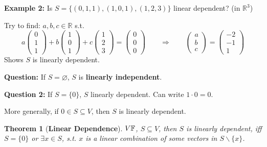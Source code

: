 \documentclass[12pt]{article}
\theoremstyle{plain}
\newtheorem{theorem}{Theorem}[subsection]
\newcommand{\mR}{{\mathbb{R}}}
\newcommand{\mF}{{\mathbb{F}}}
\let\emptyset\varnothing
\begin{document}
	{\color{Brown}
	\textbf{Example 2:} 
	Is $S = \{(0, 1, 1), (1, 0, 1), (1, 2, 3)\}$ linear dependent? (in $\mR^3$)
	
	Try to find: $a,b,c \in \mR$ s.t. 
	\[
		a \begin{pmatrix}
			0\\
			1\\
			1
		\end{pmatrix}
		+ b \begin{pmatrix}
			1\\
			0\\
			1
		\end{pmatrix}
		+ c 	\begin{pmatrix}
			1\\
			2\\
			3
		\end{pmatrix}
		= 
			\begin{pmatrix}
			0\\
			0\\
			0
		\end{pmatrix}
		\qquad \Rightarrow \qquad 	
		\begin{pmatrix}
			a\\
			b\\
			c
		\end{pmatrix} = 
			\begin{pmatrix}
			-2\\
			-1\\
			1
		\end{pmatrix}
	\]
	Shows $S$ is linearly dependent. \\

	}

	\textbf{Question: }
	If $S = \emptyset$, $S$ is \textbf{linearly independent}. 

	\textbf{Question 2: } 
	If $S = \{0\}$, $S$ linearly dependent. Can write $1\cdot 0 = 0$. 

	More generally, if $0 \in S \subseteq V$, then $S$ is linearly dependent.\\ 

	\begin{theorem}[\textbf{Linear Dependence}]
		$V \/ \mF$, $S \subseteq V$, then $S$ is linearly dependent, iff 
		$S = \{0\}$ or $\exists x \in S$, s.t. $x$ is a linear combination
		of some vectors in $S\backslash \{x\}$. 
	\end{theorem}






\newpage
\end{document}
